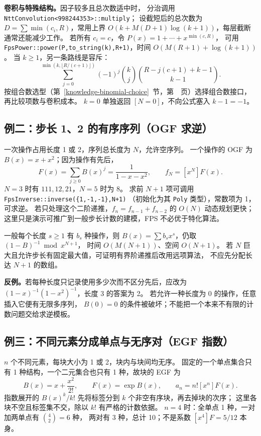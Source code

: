 \textbf{卷积与特殊结构。}因子较多且总次数适中时，
分治调用 \texttt{NttConvolution<998244353>::multiply}；
设截短后的总次数为 $D=\sum\min(c_i,R)$，常用上界
$O(k+M(D+1)\log(k+1))$，每层截断通常还能减少工作。
若所有 $c_i=c$，令 $P(x)=1+\cdots+x^{\min(c,R)}$，
可用 \texttt{FpsPower::power(P,to\_string(k),R+1)}，时间 $O(M(R+1)+\log(k+1))$。
当 $k\ge1$，另一条路线是容斥：
\[
\sum_{j=0}^{\min(k,\lfloor R/(c+1)\rfloor)}
(-1)^j\binom kj\binom{R-j(c+1)+k-1}{k-1}.
\]
按组合数选型（第~\ref{knowledge-binomial-choice}~节，第~\pageref{knowledge-binomial-choice}~页）选择组合数接口，再比较项数与卷积成本。
$k=0$ 单独返回 $[N=0]$，不向公式塞入 $k-1=-1$。

\subsection{例二：步长 1、2 的有序序列（OGF 求逆）}
一次操作占用长度 1 或 2，序列总长度为 $N$，允许空序列。
一个操作的 OGF 为 $B(x)=x+x^2$；因为操作有先后，
\[
F(x)=\sum_{j\ge0}B(x)^j=\frac1{1-x-x^2},\qquad f_N=[x^N]F(x).
\]
$N=3$ 时有 $111,12,21$，$N=5$ 时为 8。
求前 $N+1$ 项可调用
\texttt{FpsInverse::inverse(\{1,-1,-1\},N+1)}
（初始化为其 \texttt{Poly} 类型），常数项为 1，可求逆。
若只处理这个二阶递推，$f_n=f_{n-1}+f_{n-2}$ 的 $O(N)$ 动态规划更快；
这里只是演示可推广到一般步长计数的建模，FPS 不必优于特化算法。

一般每个长度 $s\ge1$ 有 $b_s$ 种操作，则
$B(x)=\sum b_sx^s$，仍取 $(1-B)^{-1}\bmod x^{N+1}$，
时间 $O(M(N+1))$、空间 $O(N+1)$。
若 $N$ 巨大且允许步长有固定最大值，可证明有界阶递推后改用远项算法，
不应先分配长达 $N+1$ 的数组。

\textbf{反例。}若每种长度只记录使用多少次而不区分先后，应改为
$(1-x)^{-1}(1-x^2)^{-1}$，长度 3 的答案为 2。
若允许一种长度为 0 的操作，任意插入它便有无限多序列，
$B(0)=0$ 的条件被破坏；不能把一个本来不有限的计数问题交给求逆模板。

\subsection{例三：不同元素分成单点与无序对（EGF 指数）}
$n$ 个不同元素，每块大小为 1 或 2，块内与块间均无序。
固定的一个单点集合只有 1 种结构，一个二元集合也只有 1 种，故块的 EGF 为
\[
B(x)=x+\frac{x^2}{2!},\qquad
F(x)=\exp B(x),\qquad a_n=n![x^n]F(x).
\]
指数展开的 $B(x)^k/k!$ 先将标签分到 $k$ 个非空有序块，再去掉块的次序；
这里各块不空且标签集不交，除以 $k!$ 有严格的计数依据。
$n=4$ 时：全单点 1 种，一对加两单点有 $\binom42=6$ 种，
两对有 3 种，总计 10；不是系数 $[x^4]F=5/12$ 本身。

